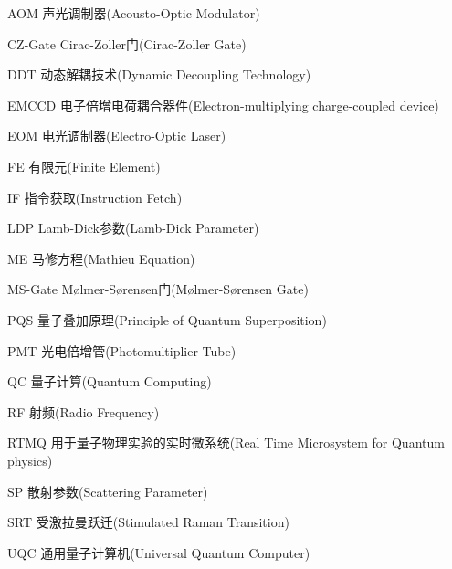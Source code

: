 \begin{denotation}[3cm]

  \item[AOM] 声光调制器(Acousto-Optic Modulator)
  \item[CZ-Gate] Cirac-Zoller门(Cirac-Zoller Gate)
  \item[DDT] 动态解耦技术(Dynamic Decoupling Technology)  
  \item[EMCCD] 电子倍增电荷耦合器件(Electron-multiplying charge-coupled device)
  \item[EOM] 电光调制器(Electro-Optic Laser)
  \item[FE] 有限元(Finite Element)
  \item[IF] 指令获取(Instruction Fetch)
  \item[LDP] Lamb-Dick参数(Lamb-Dick Parameter)
  \item[ME] 马修方程(Mathieu Equation)
  \item[MS-Gate] Mølmer-Sørensen门(Mølmer-Sørensen Gate)
  \item[PQS] 量子叠加原理(Principle of Quantum Superposition)
  \item[PMT] 光电倍增管(Photomultiplier Tube)
  \item[QC] 量子计算(Quantum Computing)
  \item[RF] 射频(Radio Frequency)
  \item[RTMQ] 用于量子物理实验的实时微系统(Real Time Microsystem for Quantum physics)
  \item[SP] 散射参数(Scattering Parameter)
  \item[SRT] 受激拉曼跃迁(Stimulated Raman Transition)
  \item[UQC] 通用量子计算机(Universal Quantum Computer)

\end{denotation}




